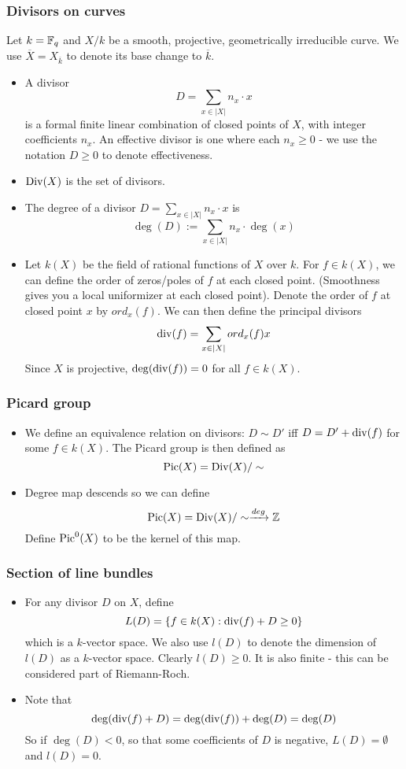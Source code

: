 \subsubsection{Divisors on curves}
Let $k = \mathbb{F}_q$ and $X/k$ be a smooth, projective, geometrically irreducible curve. We use $\overline{X} = X_{\overline{k}}$ to denote its base change to $\overline{k}$.
\begin{itemize}
    \item A divisor 
    \[
    D = \sum_{x \in |X|} n_x \cdot x
    \]
    is a formal finite linear combination of closed points of $X$, with integer coefficients $n_x$. An effective divisor is one where each $n_x \ge 0$ - we use the notation $D \ge 0$ to denote effectiveness.
    \item $\operatorname{Div}(X)$ is the set of divisors.
    \item The degree of a divisor $\displaystyle D = \sum_{x \in |X|} n_x \cdot x$ is
    \[
    \deg(D) := \sum_{x \in |X|} n_x \cdot \deg(x)
    \]
    \item Let $k(X)$ be the field of rational functions of $X$ over $k$. For $f \in k(X)$, we can define the order of zeros/poles of $f$ at each closed point. (Smoothness gives you a local uniformizer at each closed point). Denote the order of $f$ at closed point $x$ by $ord_x(f)$. We can then define the principal divisors 
    \[
    \operatorname{div}(f) = \sum_{x \in |X|} ord_x (f) x
    \]
    Since $X$ is projective, $\deg (\operatorname{div}(f)) = 0$ for all $f \in k(X)$.
\end{itemize}
\subsubsection{Picard group}
\begin{itemize}
    \item We define an equivalence relation on divisors: $D \sim D'$ iff $D = D' + \operatorname{div}(f)$ for some $f \in k(X)$. The Picard group is then defined as
    \[
    \operatorname{Pic}(X) = \operatorname{Div}(X)/\sim
    \]
    \item Degree map descends so we can define
    \[
    \operatorname{Pic}(X) = \operatorname{Div}(X)/\sim \xrightarrow{deg} \mathbb{Z}
    \]
    Define $\operatorname{Pic}^0(X)$ to be the kernel of this map.
\end{itemize}
\subsubsection{Section of line bundles}
\begin{itemize}
    \item For any divisor $D$ on $X$, define
    \[
    L(D) = \{f \in k(X): \operatorname{div}(f) + D \ge 0\}
    \]
    which is a $k$-vector space. We also use $l(D)$ to denote the dimension of $l(D)$ as a $k$-vector space. Clearly $l(D) \ge 0$. It is also finite - this can be considered part of Riemann-Roch.
    \item Note that
    \[
    \deg(\operatorname{div} (f) + D) = \deg (\operatorname{div}(f)) + \deg(D) = \deg (D)
    \]
    So if $\deg(D) < 0$, so that some coefficients of $D$ is negative, $L(D) = \emptyset$ and $l(D) = 0$.
\end{itemize}
